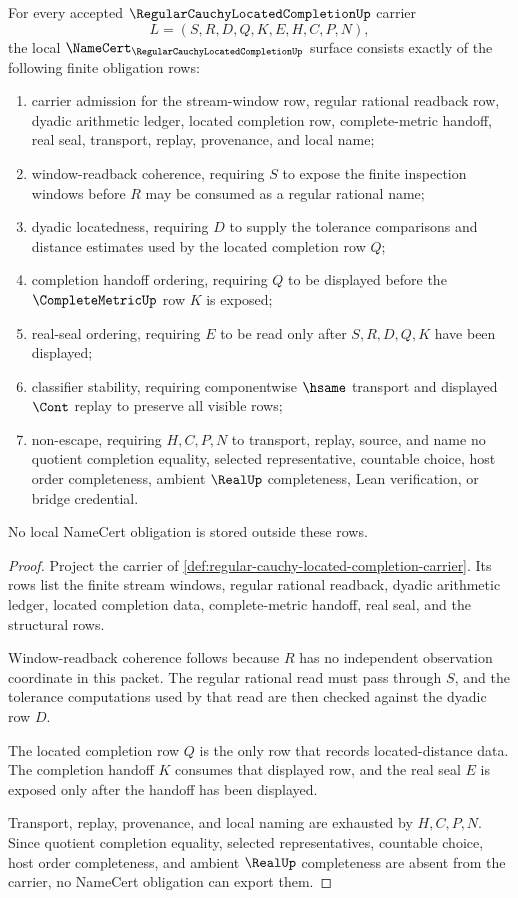 \begin{theorem}
\label{thm:regular-cauchy-located-completion-obligations}
For every accepted $\RegularCauchyLocatedCompletionUp$ carrier
$$
L=(S,R,D,Q,K,E,H,C,P,N),
$$
the local $\NameCert_{\RegularCauchyLocatedCompletionUp}$ surface consists exactly of the following finite obligation rows:
\begin{enumerate}
\item carrier admission for the stream-window row, regular rational readback row, dyadic arithmetic ledger, located completion row, complete-metric handoff, real seal, transport, replay, provenance, and local name;
\item window-readback coherence, requiring $S$ to expose the finite inspection windows before $R$ may be consumed as a regular rational name;
\item dyadic locatedness, requiring $D$ to supply the tolerance comparisons and distance estimates used by the located completion row $Q$;
\item completion handoff ordering, requiring $Q$ to be displayed before the $\CompleteMetricUp$ row $K$ is exposed;
\item real-seal ordering, requiring $E$ to be read only after $S,R,D,Q,K$ have been displayed;
\item classifier stability, requiring componentwise $\hsame$ transport and displayed $\Cont$ replay to preserve all visible rows;
\item non-escape, requiring $H,C,P,N$ to transport, replay, source, and name no quotient completion equality, selected representative, countable choice, host order completeness, ambient $\RealUp$ completeness, Lean verification, or bridge credential.
\end{enumerate}
No local NameCert obligation is stored outside these rows.
\end{theorem}
\begin{proof}
Project the carrier of \autoref{def:regular-cauchy-located-completion-carrier}. Its rows list the finite stream windows, regular rational readback, dyadic arithmetic ledger, located completion data, complete-metric handoff, real seal, and the structural rows.

Window-readback coherence follows because $R$ has no independent observation coordinate in this packet. The regular rational read must pass through $S$, and the tolerance computations used by that read are then checked against the dyadic row $D$.

The located completion row $Q$ is the only row that records located-distance data. The completion handoff $K$ consumes that displayed row, and the real seal $E$ is exposed only after the handoff has been displayed.

Transport, replay, provenance, and local naming are exhausted by $H,C,P,N$. Since quotient completion equality, selected representatives, countable choice, host order completeness, and ambient $\RealUp$ completeness are absent from the carrier, no NameCert obligation can export them.
\end{proof}

